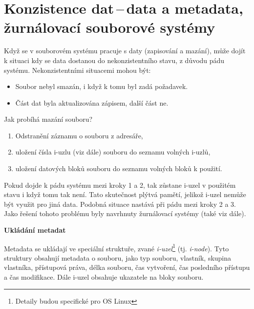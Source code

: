 
\newpage
\section{Konzistence dat\,--\,data a metadata, žurnálovací souborové systémy}

Když se v souborovém systému pracuje s daty (zapisování a mazání), může dojít k situaci kdy se data dostanou do nekonzistentního stavu, z důvodu pádu systému. Nekonzistentními situacemi mohou být:

\begin{itemize}
    \item Soubor nebyl smazán, i když k tomu byl zadá požadavek.
    \item Část dat byla aktualizována zápisem, další část ne. 
\end{itemize}

Jak probíhá mazání souboru?

\begin{enumerate}
    \item Odstranění záznamu o souboru z adresáře,
    \item uložení čísla i-uzlu (viz dále) souboru do seznamu volných i-uzlů,
    \item uložení datových bloků souboru do seznamu volných bloků k použití.
\end{enumerate}

Pokud dojde k pádu systému mezi kroky 1 a 2, tak zůstane i-uzel v použitém stavu i když tomu tak není. Tato skutečnost plýtvá pamětí, jelikož i-uzel nemůže být využit pro jiná data. Podobná situace nastává při pádu mezi kroky 2 a 3. Jako řešení tohoto problému byly navrhnuty žurnálovací systémy (také viz dále). 

\begin{Large}
    \vspace{0,5cm}
    \textbf{Ukládání metadat}
\end{Large}

Metadata se ukládají ve speciální struktuře, zvané \textit{i-uzel}\footnote{Detaily budou specifické pro OS Linux} (tj. \textit{i-node}). Tyto struktury obsahují metadata o souboru, jako typ souboru, vlastník, skupina vlastníka, přístupová práva, délka souboru, čas vytvoření, čas posledního přístupu a čas modifikace. Dále i-uzel obsahuje ukazatele na bloky souboru. 

\vspace{0,5cm}

